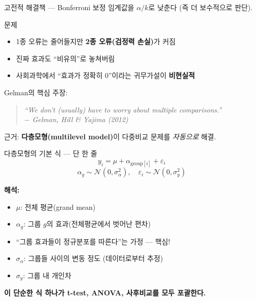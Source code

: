 \documentclass[aspectratio=169, 11pt]{beamer}
\begin{document}
\begin{frame}{고전적 해결책 — Bonferroni 보정}
임계값을 $\alpha/k$로 낮춘다 (즉 더 보수적으로 판단).
\vspace{0.3cm}

\begin{block}{문제}
\begin{itemize}
\item 1종 오류는 줄어들지만 \textbf{2종 오류(검정력 손실)}가 커짐
\item 진짜 효과도 ``비유의''로 놓쳐버림
\item 사회과학에서 ``효과가 정확히 0''이라는 귀무가설이 \textbf{비현실적}
\end{itemize}
\end{block}

\vspace{0.3cm}
Gelman의 핵심 주장:
\begin{quote}
\centering
\itshape ``We don't (usually) have to worry about multiple comparisons.''\\
$-$ Gelman, Hill \& Yajima (2012)
\end{quote}

근거: \textbf{다층모형(multilevel model)}이 다중비교 문제를 \emph{자동으로} 해결.
\end{frame}

\begin{frame}{다층모형의 기본 식 — 단 한 줄}
\large
$$
y_i = \mu + \alpha_{\text{group}[i]} + \varepsilon_i
$$
$$
\alpha_g \sim \mathcal{N}(0, \sigma_\alpha^2), \quad \varepsilon_i \sim \mathcal{N}(0, \sigma_y^2)
$$

\normalsize
\vspace{0.3cm}
\textbf{해석:}
\begin{itemize}
\item $\mu$: 전체 평균(grand mean)
\item $\alpha_g$: 그룹 $g$의 효과(전체평균에서 벗어난 편차)
\item ``그룹 효과들이 정규분포를 따른다''는 가정 — 핵심!
\item $\sigma_\alpha$: 그룹들 사이의 변동 정도 (데이터로부터 추정)
\item $\sigma_y$: 그룹 내 개인차
\end{itemize}

\vspace{0.3cm}
\centering
\textbf{이 단순한 식 하나가 t-test, ANOVA, 사후비교를 모두 포괄한다.}
\end{frame}
\end{document}
